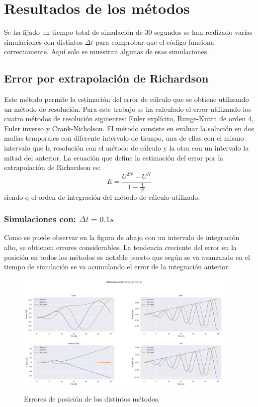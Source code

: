 \documentclass[12pt,a4paper]{article}
\begin{document}
\section{Resultados de los métodos}
Se ha fijado un tiempo total de simulación de 30 segundos se han realizado varias simulaciones con distintos $\Delta t$ para comprobar que el código funciona correctamente. Aquí solo se muestran algunas de esas simulaciones.

\subsection{Error por extrapolación de Richardson}
Este método permite la estimación del error de cálculo que se obtiene utilizando un método de resolución. Para este trabajo se ha calculado el error utilizando los cuatro métodos de resolución siguientes: Euler explícito, Runge-Kutta de orden 4, Euler inverso y Crank-Nicholson. El método consiste en evaluar la solución en dos mallas temporales con diferente intervalo de tiempo, una de ellas con el mismo intervalo que la resolución con el método de cálculo y la otra con un intervalo la mitad del anterior. La ecuación que define la estimación del error por la extrapolación de Richardson es:
\begin{equation} 
	E = \frac{U^{2N} - U^{N}}{1 - \frac{1}{2^{q}}}
\end{equation} 
siendo q el orden de integración del método de cálculo utilizado.

\subsubsection{Simulaciones con: $\Delta t = 0.1 s$}
Como se puede observar en la figura de abajo con un intervalo de integración alto, se obtienen errores considerables. La tendencia creciente del error en la posición en todos los métodos es notable puesto que según se va avanzando en el tiempo de simulación se va acumulando el error de la integración anterior.
\begin{figure}[H] 
	\centering
	\includegraphics[width=0.95\textwidth]{FIGURES/dt0.1_error.png}
	\caption{Errores de posición de los distintos métodos.}
\end{figure}
\end{document}
